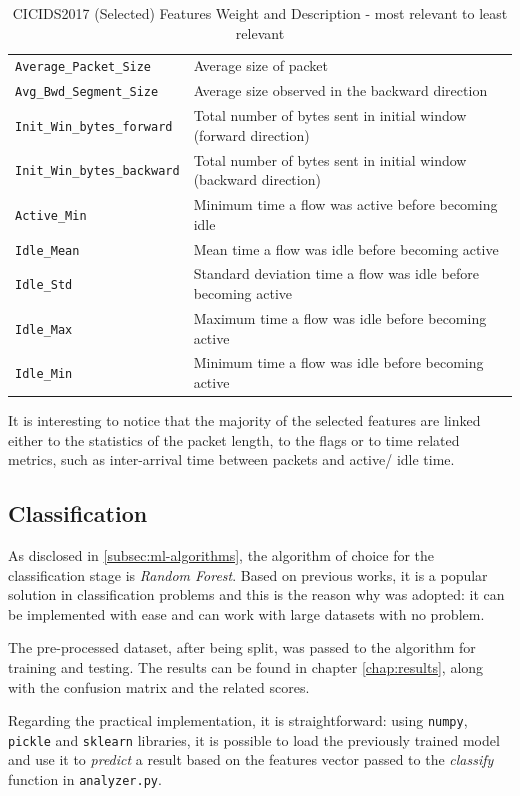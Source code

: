 \begin{table}[h!]
\begin{tabular}{l|l}
        \rowcolor{black!10} \texttt{Average\_Packet\_Size} & Average size of packet \\
        \texttt{Avg\_Bwd\_Segment\_Size} & Average size observed in the backward direction \\
        \rowcolor{black!10} \texttt{Init\_Win\_bytes\_forward} & Total number of bytes sent in initial window (forward direction) \\
        \texttt{Init\_Win\_bytes\_backward} & Total number of bytes sent in initial window (backward direction) \\
        \rowcolor{black!10} \texttt{Active\_Min} & Minimum time a flow was active before becoming idle \\
        \texttt{Idle\_Mean} & Mean time a flow was idle before becoming active \\
        \rowcolor{black!10} \texttt{Idle\_Std} & Standard deviation time a flow was idle before becoming active \\
        \texttt{Idle\_Max} & Maximum time a flow was idle before becoming active \\
        \rowcolor{black!10} \texttt{Idle\_Min} & Minimum time a flow was idle before becoming active \\
        \bottomrule
    \end{tabular}
    \caption{CICIDS2017 (Selected) Features Weight and Description - most relevant to least relevant}
    \label{tab:features-weight}
\end{table}

\noindent It is interesting to notice that the majority of the selected features are linked either to the statistics of the packet length, to the flags or to time related metrics, such as inter-arrival time between packets and active/ idle time.


\subsection{Classification}
\label{subsec:classification}

As disclosed in \ref{subsec:ml-algorithms}, the algorithm of choice for the classification stage is \textit{Random Forest}. Based on previous works, it is a popular solution in classification problems and this is the reason why was adopted: it can be implemented with ease and can work with large datasets with no problem.
\par The pre-processed dataset, after being split, was passed to the algorithm for training and testing. The results can be found in chapter \ref{chap:results}, along with the confusion matrix and the related scores.
\par Regarding the practical implementation, it is straightforward: using \texttt{numpy}, \texttt{pickle} and \texttt{sklearn} libraries, it is possible to load the previously trained model and use it to \textit{predict} a result based on the features vector passed to the \textit{classify} function in \texttt{analyzer.py}.

